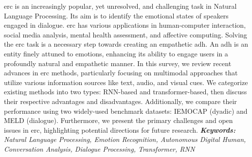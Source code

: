\sloppypar

    \ac{erc} is an increasingly popular, yet unresolved, and challenging task in Natural Language Processing. Its aim is to identify the emotional states of speakers engaged in dialogue. \ac{erc} has various applications in human-computer interaction, social media analysis, mental health assessment, and affective computing. Solving the \ac{erc} task is a necessary step towards creating an empathetic \ac{adh}. An \ac{adh} is an entity finely attuned to emotions, enhancing its ability to engage users in a profoundly natural and empathetic manner. In this survey, we review recent advances in \ac{erc} methods, particularly focusing on multimodal approaches that utilize various information sources like text, audio, and visual cues. We categorize existing methods into two types: RNN-based and transformer-based, then discuss their respective advantages and disadvantages. Additionally, we compare their performance using two widely-used benchmark datasets: IEMOCAP (dyadic) and MELD (dialogue). Furthermore, we present the primary challenges and open issues in \ac{erc}, highlighting potential directions for future research. \newline \newline 
    \textit{\textbf{Keywords:} Natural Language Processing, Emotion Recognition, Autonomous Digital Human, Conversation Analysis, Dialogue Processing, Transformer, RNN}

    